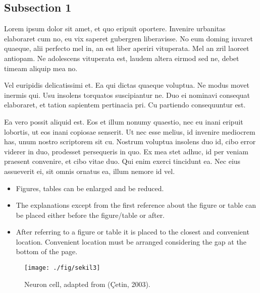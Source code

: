\subsection{Subsection 1}

Lorem ipsum dolor sit amet, et quo eripuit oportere. Invenire urbanitas elaboraret cum no, eu vix saperet gubergren liberavisse. No eum doming iuvaret quaeque, alii perfecto mel in, an est liber aperiri vituperata. Mel an zril laoreet antiopam. Ne adolescens vituperata est, laudem altera eirmod sed ne, debet timeam aliquip mea no.

Vel euripidis delicatissimi et. Ea qui dictas quaeque voluptua. Ne modus movet inermis qui. Usu insolens torquatos suscipiantur ne. Duo ei nominavi consequat elaboraret, et tation sapientem pertinacia pri. Cu partiendo consequuntur est.

Ea vero possit aliquid est. Eos et illum nonumy quaestio, nec eu inani eripuit lobortis, ut eos inani copiosae senserit. Ut nec esse melius, id invenire mediocrem has, unum nostro scriptorem sit cu. Nostrum voluptua insolens duo id, cibo error viderer in duo, prodesset persequeris in quo. Ex mea stet adhuc, id per veniam praesent convenire, et cibo vitae duo. Qui enim exerci tincidunt ea. Nec eius assueverit ei, sit omnis ornatus ea, illum nemore id vel.

\begin{itemize}
	\setlength{\itemindent}{-0.35em} %
	\item{Figures, tables can be enlarged and be reduced.}
	\vspace{-3mm}
	\item{The explanations except from the first reference about the figure or table can be placed either before the figure/table or after.}
	\vspace{-3mm}
	\item{After referring to a figure or table it is placed to the closest and convenient location. Convenient location must be arranged considering the gap at the bottom of the page.}
\end{itemize}

\begin{figure}
	\centering
	\texttt{[image: ./fig/sekil3]}
	\caption{Neuron cell, adapted from (\c{C}etin, 2003).}
	\label{Figure3.1}
\end{figure}

